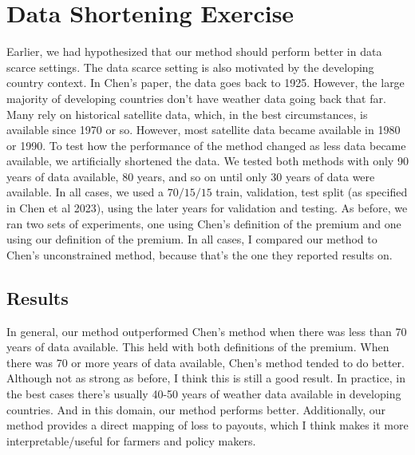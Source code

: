 \documentclass[11pt]{article}
\begin{document}
\section{Data Shortening Exercise}
  Earlier, we had hypothesized that our method should perform better in data scarce settings. The data scarce setting is also motivated by the developing country context. In Chen's paper, the data goes back to 1925. However, the large majority of developing countries don't have weather data going back that far. Many rely on historical satellite data, which, in the best circumstances, is available since 1970 or so. However, most satellite data became available in 1980 or 1990. 
  To test how the performance of the method changed as less data became available, we artificially shortened the data. We tested both methods with only 90 years of data available, 80 years, and so on until only 30 years of data were available. In all cases, we used a $70/15/15$ train, validation, test split (as specified in Chen et al 2023), using the later years for validation and testing. As before, we ran two sets of experiments, one using Chen's definition of the premium and one using our definition of the premium. In all cases, I compared our method to Chen's unconstrained method, because that's the one they reported results on. 

  \subsection{Results}
    In general, our method outperformed Chen's method when there was less than 70 years of data available. This held with both definitions of the premium. When there was 70 or more years of data available, Chen's method tended to do better. Although not as strong as before, I think this is still a good result. In practice, in the best cases there's usually 40-50 years of weather data available in developing countries. And in this domain, our method performs better. Additionally, our method provides a direct mapping of loss to payouts, which I think makes it more interpretable/useful for farmers and policy makers. 
\end{document}
